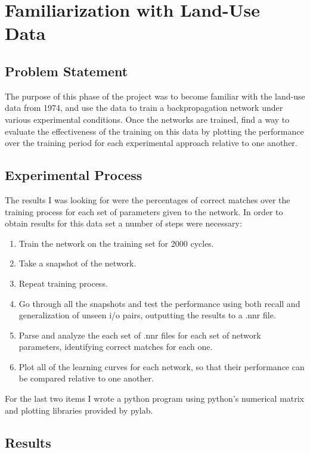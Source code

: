 \documentclass[12pt]{article}
\begin{document}
\maketitle

\section{Familiarization with Land-Use Data}

\subsection{Problem Statement}

The purpose of this phase of the project was to become familiar with the land-use data from 1974, and use the data to train a backpropagation network under various experimental conditions.  Once the networks are trained, find a way to evaluate the effectiveness of the training on this data by plotting the performance over the training period for each experimental approach relative to one another.

\subsection{Experimental Process}

The results I was looking for were the percentages of correct matches over the training process for each set of parameters given to the network.  In order to obtain results for this data set a number of steps were necessary:

\begin{enumerate}
\item Train the network on the training set for 2000 cycles.
\item Take a snapshot of the network.
\item Repeat training process.
\item Go through all the snapshots and test the performance using both recall and generalization of unseen i/o pairs, outputting the results to a .nnr file.
\item Parse and analyze the each set of .nnr files for each set of network parameters, identifying correct matches for each one.
\item Plot all of the learning curves for each network, so that their performance can be compared relative to one another.
\end{enumerate}

For the last two items I wrote a python program using python's numerical matrix and plotting libraries provided by pylab.  

\subsection{Results}
\end{document}
